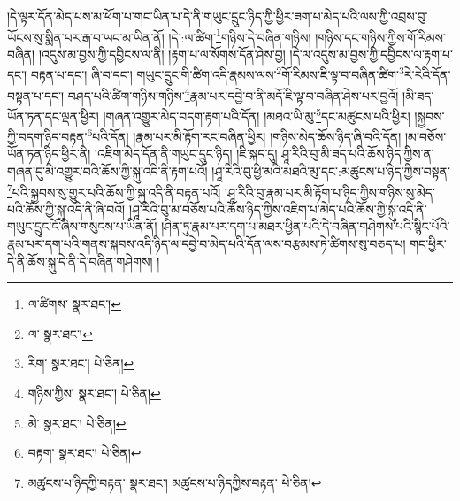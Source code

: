 །དེ་ལྟར་དོན་མེད་པས་མ་ཕོག་པ་གང་ཡིན་པ་དེ་ནི་གཡུང་དྲུང་ཉིད་ཀྱི་ཕྱིར་ཟག་པ་མེད་པའི་ལས་ཀྱི་འབྲས་བུ་ཡོངས་སུ་སྨིན་པར་རྒ་བ་ཡང་མ་ཡིན་ནོ། །དེ་:ལ་ཚིག་\footnote{ལ་ཚིགས་  སྣར་ཐང་། }གཉིས་དེ་བཞིན་གཉིས། །གཉིས་དང་གཉིས་ཀྱིས་གོ་རིམས་བཞིན། །འདུས་མ་བྱས་ཀྱི་དབྱིངས་ལ་ནི། །རྟག་པ་ལ་སོགས་དོན་ཤེས་བྱ། །དེ་ལ་འདུས་མ་བྱས་ཀྱི་དབྱིངས་ལ་རྟག་པ་དང་། བརྟན་པ་དང་། ཞི་བ་དང་། གཡུང་དྲུང་གི་ཚིག་འདི་རྣམས་ལས་\footnote{ལ་  སྣར་ཐང་། }གོ་རིམས་ཇི་ལྟ་བ་བཞིན་ཚིག་\footnote{རིག་  སྣར་ཐང་།  པེ་ཅིན། }རེ་རེའི་དོན་བསྟན་པ་དང་། བཤད་པའི་ཚིག་གཉིས་གཉིས་\footnote{གཉིས་ཀྱིས་  སྣར་ཐང་།  པེ་ཅིན། }རྣམ་པར་དབྱེ་བ་ནི་མདོ་ཇི་ལྟ་བ་བཞིན་ཤེས་པར་བྱའོ། །མི་ཟད་ཡོན་ཏན་དང་ལྡན་ཕྱིར། །གཞན་འགྱུར་མེད་བདག་རྟག་པའི་དོན། །མཐའ་ཡི་མུ་\footnote{མེ་  སྣར་ཐང་།  པེ་ཅིན། }དང་མཚུངས་པའི་ཕྱིར། །སྐྱབས་ཀྱི་བདག་ཉིད་བརྟན་\footnote{བརྟག་  སྣར་ཐང་།  པེ་ཅིན། }པའི་དོན། །རྣམ་པར་མི་རྟོག་རང་བཞིན་ཕྱིར། །གཉིས་མེད་ཆོས་ཉིད་ཞི་བའི་དོན། །མ་བཅོས་ཡོན་ཏན་ཉིད་ཕྱིར་ནི། །འཇིག་མེད་དོན་ནི་གཡུང་དྲུང་ཉིད། །ཇི་སྐད་དུ། ཤཱ་རིའི་བུ་མི་ཟད་པའི་ཆོས་ཉིད་ཀྱིས་ན་གཞན་དུ་མི་འགྱུར་བའི་ཆོས་ཀྱི་སྐུ་འདི་ནི་རྟག་པའོ། །ཤཱ་རིའི་བུ་ཕྱི་མའི་མཐའི་མུ་དང་:མཚུངས་པ་ཉིད་ཀྱིས་བསྟན་\footnote{མཚུངས་པ་ཉིདཀྱི་བརྟན་  སྣར་ཐང་། མཚུངས་པ་ཉིདཀྱིས་བརྟན་  པེ་ཅིན། }པའི་སྐྱབས་སུ་གྱུར་པའི་ཆོས་ཀྱི་སྐུ་འདི་ནི་བརྟན་པའོ། །ཤཱ་རིའི་བུ་རྣམ་པར་མི་རྟོག་པ་ཉིད་ཀྱིས་གཉིས་སུ་མེད་པའི་ཆོས་ཀྱི་སྐུ་འདི་ནི་ཞི་བའོ། །ཤཱ་རིའི་བུ་མ་བཅོས་པའི་ཆོས་ཉིད་ཀྱིས་འཇིག་པ་མེད་པའི་ཆོས་ཀྱི་སྐུ་འདི་ནི་གཡུང་དྲུང་ངོ་ཞེས་གསུངས་པ་ཡིན་ནོ། །ཤིན་ཏུ་རྣམ་པར་དག་པ་མཐར་ཕྱིན་པའི་དེ་བཞིན་གཤེགས་པའི་སྙིང་པོའི་རྣམ་པར་དག་པའི་གནས་སྐབས་འདི་ཉིད་ལ་དབྱེ་བ་མེད་པའི་དོན་ལས་བརྩམས་ཏེ་ཚིགས་སུ་བཅད་པ། གང་ཕྱིར་དེ་ནི་ཆོས་སྐུ་དེ་ནི་དེ་བཞིན་གཤེགས། །
